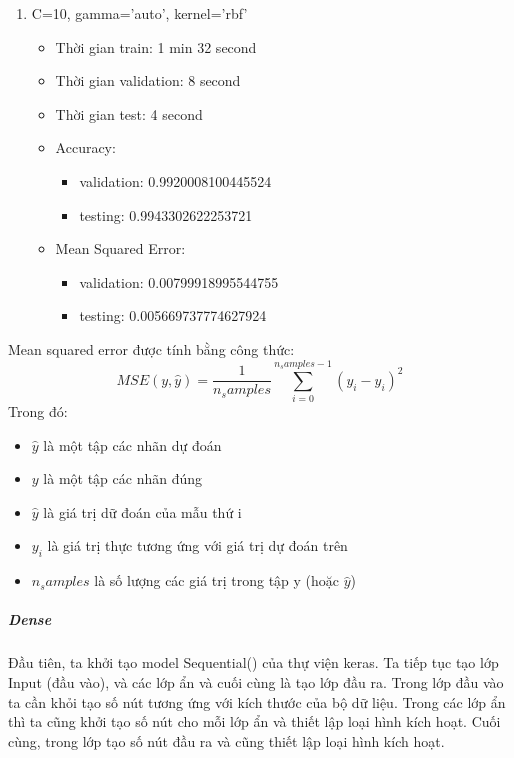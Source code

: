 \documentclass{article}
\begin{document}
\begin{enumerate}
\begin{itemize}
\begin{itemize}
		            \end{itemize}
	      \end{itemize}
	\item C=10, gamma='auto', kernel='rbf'
	      \begin{itemize}
		      \item Thời gian train: 1 min 32 second
		      \item Thời gian validation: 8 second
		      \item Thời gian test: 4 second
		      \item Accuracy:
		            \begin{itemize}
			            \item validation: 0.9920008100445524
			            \item testing: 0.9943302622253721
		            \end{itemize}
		      \item Mean Squared Error:
		            \begin{itemize}
			            \item validation: 0.00799918995544755
			            \item testing: 0.005669737774627924
		            \end{itemize}
	      \end{itemize}
\end{enumerate}

Mean squared error được tính bằng công thức:
\begin{equation}
	MSE(y,\widehat{y}) = \frac{1}{n_samples} \sum_{i = 0}^{n_samples-1} (y_i - \widehat{y}_i)^2
\end{equation}
Trong đó:
\begin{itemize}
	\item $\widehat{y}$ là một tập các nhãn dự đoán
	\item $y$ là một tập các nhãn đúng
	\item $\widehat{y}$ là giá trị dữ đoán của mẫu thứ i
	\item $y_i$ là giá trị thực tương ứng với giá trị dự đoán trên
	\item $n_samples$ là số lượng các giá trị trong tập y (hoặc $\widehat{y}$)
\end{itemize}

\subparagraph{Dense}

Đầu tiên, ta khởi tạo model Sequential() của thự viện keras. Ta tiếp tục tạo lớp Input (đầu vào), và các lớp ẩn và cuối cùng là tạo lớp đầu ra. Trong lớp đầu vào ta cần khỏi tạo số nút tương ứng với kích thước của bộ dữ liệu. Trong các lớp ẩn thì ta cũng khởi tạo số nút cho mỗi lớp ẩn và thiết lập loại hình kích hoạt. Cuối cùng, trong lớp tạo số nút đầu ra và cũng thiết lập loại hình kích hoạt.
\end{document}
